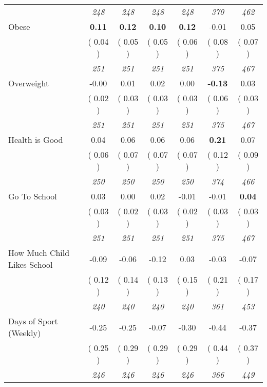 \begin{tabular}{l c c c c c c}
& \textit{ 248 } & \textit{ 248 } & \textit{ 248 } & \textit{ 248 } & \textit{ 370 } & \textit{ 462 } \\
Obese & \textbf{      0.11 } & \textbf{      0.12 } & \textbf{      0.10 } & \textbf{     0.12} &     -0.01 &      0.05 \\
& (     0.04 ) & (     0.05 ) & (     0.05 ) & (     0.06 ) & (     0.08 ) & (     0.07 ) \\
& \textit{ 251 } & \textit{ 251 } & \textit{ 251 } & \textit{ 251 } & \textit{ 375 } & \textit{ 467 } \\
Overweight &     -0.00 &      0.01 &      0.02 &      0.00 & \textbf{     -0.13 } &      0.03 \\
& (     0.02 ) & (     0.03 ) & (     0.03 ) & (     0.03 ) & (     0.06 ) & (     0.03 ) \\
& \textit{ 251 } & \textit{ 251 } & \textit{ 251 } & \textit{ 251 } & \textit{ 375 } & \textit{ 467 } \\
Health is Good &      0.04 &      0.06 &      0.06 &      0.06 & \textbf{      0.21 } &      0.07 \\
& (     0.06 ) & (     0.07 ) & (     0.07 ) & (     0.07 ) & (     0.12 ) & (     0.09 ) \\
& \textit{ 250 } & \textit{ 250 } & \textit{ 250 } & \textit{ 250 } & \textit{ 374 } & \textit{ 466 } \\
Go To School &      0.03 &      0.00 &      0.02 &     -0.01 &     -0.01 & \textbf{      0.04 } \\
& (     0.03 ) & (     0.02 ) & (     0.03 ) & (     0.02 ) & (     0.03 ) & (     0.03 ) \\
& \textit{ 251 } & \textit{ 251 } & \textit{ 251 } & \textit{ 251 } & \textit{ 375 } & \textit{ 467 } \\
How Much Child Likes School &     -0.09 &     -0.06 &     -0.12 &      0.03 &     -0.03 &     -0.07 \\
& (     0.12 ) & (     0.14 ) & (     0.13 ) & (     0.15 ) & (     0.21 ) & (     0.17 ) \\
& \textit{ 240 } & \textit{ 240 } & \textit{ 240 } & \textit{ 240 } & \textit{ 361 } & \textit{ 453 } \\
Days of Sport (Weekly) &     -0.25 &     -0.25 &     -0.07 &     -0.30 &     -0.44 &     -0.37 \\
& (     0.25 ) & (     0.29 ) & (     0.29 ) & (     0.29 ) & (     0.44 ) & (     0.37 ) \\
& \textit{ 246 } & \textit{ 246 } & \textit{ 246 } & \textit{ 246 } & \textit{ 366 } & \textit{ 449 } \\
\bottomrule
\end{tabular}
